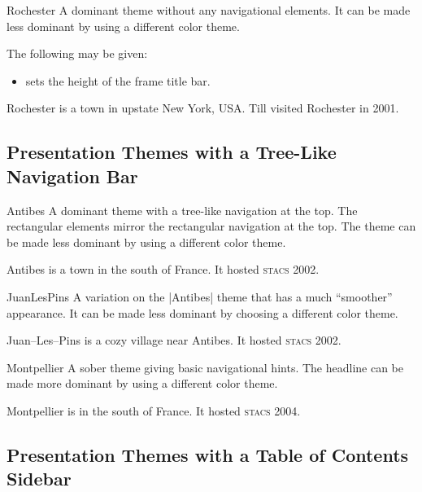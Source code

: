 \begin{themeexample}{Rochester}
  A dominant theme without any navigational elements. It can be made less dominant by using a different color theme.

  The following  may be given:
  \begin{itemize}
  \item {} sets the height of the frame title bar.
  \end{itemize}

  Rochester is a town in upstate New York, USA. Till visited Rochester in 2001.
\end{themeexample}


\subsection{Presentation Themes with a Tree-Like Navigation Bar}

\begin{themeexample}{Antibes}
  A dominant theme with a tree-like navigation at the top. The rectangular elements mirror the rectangular navigation at the top. The theme can be made less dominant by using a different color theme.

  Antibes is a town in the south of France. It hosted \textsc{stacs} 2002.
\end{themeexample}

\begin{themeexample}{JuanLesPins}
  A variation on the |Antibes| theme that has a much ``smoother'' appearance. It can be made less dominant by choosing a different color theme.

  Juan--Les--Pins is a cozy village near Antibes. It hosted \textsc{stacs} 2002.
\end{themeexample}

\begin{themeexample}{Montpellier}
  A sober theme giving basic navigational hints. The headline can be made more dominant by using a different color theme.

  Montpellier is in the south of France. It hosted \textsc{stacs} 2004.
\end{themeexample}


\subsection{Presentation Themes with a Table of Contents Sidebar}

